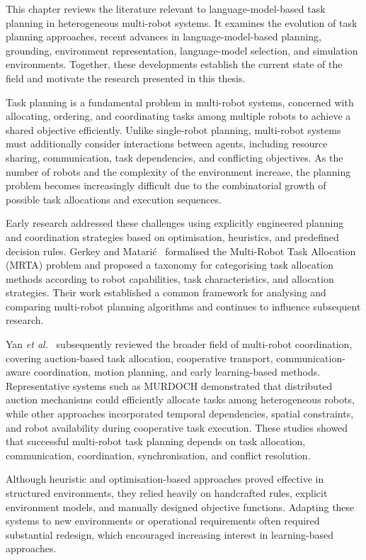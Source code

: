 This chapter reviews the literature relevant to language-model-based task planning in heterogeneous multi-robot systems. It examines the evolution of task planning approaches, recent advances in language-model-based planning, grounding, environment representation, language-model selection, and simulation environments. Together, these developments establish the current state of the field and motivate the research presented in this thesis.

Task planning is a fundamental problem in multi-robot systems, concerned with allocating, ordering, and coordinating tasks among multiple robots to achieve a shared objective efficiently. Unlike single-robot planning, multi-robot systems must additionally consider interactions between agents, including resource sharing, communication, task dependencies, and conflicting objectives. As the number of robots and the complexity of the environment increase, the planning problem becomes increasingly difficult due to the combinatorial growth of possible task allocations and execution sequences.

Early research addressed these challenges using explicitly engineered planning and coordination strategies based on optimisation, heuristics, and predefined decision rules. Gerkey and Matari\'c~\cite{gerkey2004formal} formalised the Multi-Robot Task Allocation (MRTA) problem and proposed a taxonomy for categorising task allocation methods according to robot capabilities, task characteristics, and allocation strategies. Their work established a common framework for analysing and comparing multi-robot planning algorithms and continues to influence subsequent research.

Yan \textit{et al.}~\cite{yan2013mrscoordination} subsequently reviewed the broader field of multi-robot coordination, covering auction-based task allocation, cooperative transport, communication-aware coordination, motion planning, and early learning-based methods. Representative systems such as MURDOCH demonstrated that distributed auction mechanisms could efficiently allocate tasks among heterogeneous robots, while other approaches incorporated temporal dependencies, spatial constraints, and robot availability during cooperative task execution. These studies showed that successful multi-robot task planning depends on task allocation, communication, coordination, synchronisation, and conflict resolution.

Although heuristic and optimisation-based approaches proved effective in structured environments, they relied heavily on handcrafted rules, explicit environment models, and manually designed objective functions. Adapting these systems to new environments or operational requirements often required substantial redesign, which encouraged increasing interest in learning-based approaches.

